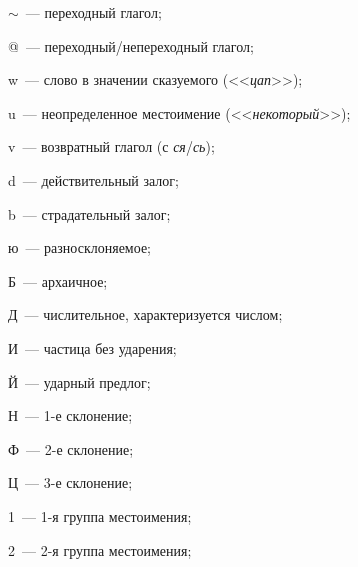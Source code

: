 $\sim$~--- переходный глагол;





@~--- переходный/непереходный глагол;





w~--- слово в значении сказуемого (<<\textit{цап}>>);





u~--- неопределенное местоимение (<<\textit{некоторый}>>);





v~--- возвратный глагол (с \textit{ся}/\textit{сь});





d~--- действительный залог;





b~--- страдательный залог;





ю~--- разносклоняемое;





Б~--- архаичное;





Д~--- числительное, характеризуется числом;





И~--- частица без ударения;





Й~--- ударный предлог;





Н~--- 1-е склонение;





Ф~--- 2-е склонение;





Ц~--- 3-е склонение;





1~---  1-я группа местоимения;





2~---  2-я группа местоимения;





